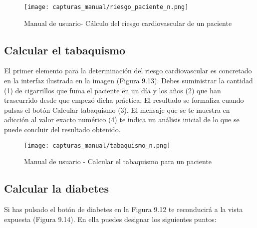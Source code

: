 \documentclass[11pt,spanish,
		listoftables,listoffigures]
		{tfgplantilla}
\begin{document}
\begin{figure}[H]
\centering
\texttt{[image: capturas\_manual/riesgo\_paciente\_n.png]}
\caption{Manual de usuario- Cálculo del riesgo cardiovascular de un paciente}
\end{figure}

\newpage
\subsection {Calcular el tabaquismo}

El primer elemento para la determinación del riesgo cardiovascular es concretado en la interfaz ilustrada en la imagen (Figura 9.13). Debes suministrar la cantidad (1) de cigarrillos que fuma el paciente en un día y los años (2) que han trascurrido desde que empezó dicha práctica. El resultado se formaliza cuando pulsas el botón \textquotedbl Calcular tabaquismo\textquotedbl{} (3). El mensaje que se te muestra en adicción al valor exacto numérico (4) te indica un análisis inicial de lo que se puede concluir del resultado obtenido.

\begin{figure}[H]
\centering
\texttt{[image: capturas\_manual/tabaquismo\_n.png]}
\caption{Manual de usuario - Calcular el tabaquismo para un paciente}
\end{figure}

\newpage
\subsection {Calcular la diabetes}

Si has pulsado el botón de diabetes en la Figura 9.12 te reconducirá a la vista expuesta (Figura 9.14). En ella puedes designar los siguientes puntos:
\end{document}
